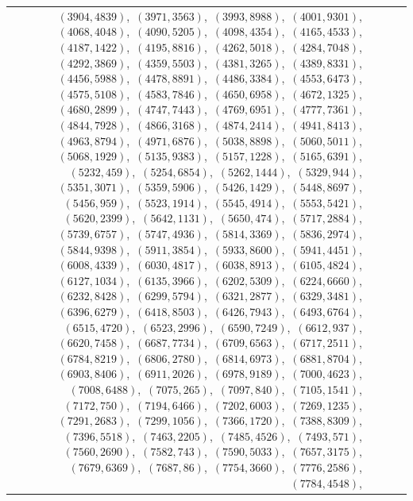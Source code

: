 \documentclass[11pt]{article}
\begin{document}
\begin{longtable}{@{}rrl>{\raggedright\arraybackslash}p{}@{}}
$(3904,4839)$,\allowbreak\ $(3971,3563)$,\allowbreak\ $(3993,8988)$,\allowbreak\ $(4001,9301)$,\allowbreak\ $(4068,4048)$,\allowbreak\ $(4090,5205)$,\allowbreak\ $(4098,4354)$,\allowbreak\ $(4165,4533)$,\allowbreak\ $(4187,1422)$,\allowbreak\ $(4195,8816)$,\allowbreak\ $(4262,5018)$,\allowbreak\ $(4284,7048)$,\allowbreak\ $(4292,3869)$,\allowbreak\ $(4359,5503)$,\allowbreak\ $(4381,3265)$,\allowbreak\ $(4389,8331)$,\allowbreak\ $(4456,5988)$,\allowbreak\ $(4478,8891)$,\allowbreak\ $(4486,3384)$,\allowbreak\ $(4553,6473)$,\allowbreak\ $(4575,5108)$,\allowbreak\ $(4583,7846)$,\allowbreak\ $(4650,6958)$,\allowbreak\ $(4672,1325)$,\allowbreak\ $(4680,2899)$,\allowbreak\ $(4747,7443)$,\allowbreak\ $(4769,6951)$,\allowbreak\ $(4777,7361)$,\allowbreak\ $(4844,7928)$,\allowbreak\ $(4866,3168)$,\allowbreak\ $(4874,2414)$,\allowbreak\ $(4941,8413)$,\allowbreak\ $(4963,8794)$,\allowbreak\ $(4971,6876)$,\allowbreak\ $(5038,8898)$,\allowbreak\ $(5060,5011)$,\allowbreak\ $(5068,1929)$,\allowbreak\ $(5135,9383)$,\allowbreak\ $(5157,1228)$,\allowbreak\ $(5165,6391)$,\allowbreak\ $(5232,459)$,\allowbreak\ $(5254,6854)$,\allowbreak\ $(5262,1444)$,\allowbreak\ $(5329,944)$,\allowbreak\ $(5351,3071)$,\allowbreak\ $(5359,5906)$,\allowbreak\ $(5426,1429)$,\allowbreak\ $(5448,8697)$,\allowbreak\ $(5456,959)$,\allowbreak\ $(5523,1914)$,\allowbreak\ $(5545,4914)$,\allowbreak\ $(5553,5421)$,\allowbreak\ $(5620,2399)$,\allowbreak\ $(5642,1131)$,\allowbreak\ $(5650,474)$,\allowbreak\ $(5717,2884)$,\allowbreak\ $(5739,6757)$,\allowbreak\ $(5747,4936)$,\allowbreak\ $(5814,3369)$,\allowbreak\ $(5836,2974)$,\allowbreak\ $(5844,9398)$,\allowbreak\ $(5911,3854)$,\allowbreak\ $(5933,8600)$,\allowbreak\ $(5941,4451)$,\allowbreak\ $(6008,4339)$,\allowbreak\ $(6030,4817)$,\allowbreak\ $(6038,8913)$,\allowbreak\ $(6105,4824)$,\allowbreak\ $(6127,1034)$,\allowbreak\ $(6135,3966)$,\allowbreak\ $(6202,5309)$,\allowbreak\ $(6224,6660)$,\allowbreak\ $(6232,8428)$,\allowbreak\ $(6299,5794)$,\allowbreak\ $(6321,2877)$,\allowbreak\ $(6329,3481)$,\allowbreak\ $(6396,6279)$,\allowbreak\ $(6418,8503)$,\allowbreak\ $(6426,7943)$,\allowbreak\ $(6493,6764)$,\allowbreak\ $(6515,4720)$,\allowbreak\ $(6523,2996)$,\allowbreak\ $(6590,7249)$,\allowbreak\ $(6612,937)$,\allowbreak\ $(6620,7458)$,\allowbreak\ $(6687,7734)$,\allowbreak\ $(6709,6563)$,\allowbreak\ $(6717,2511)$,\allowbreak\ $(6784,8219)$,\allowbreak\ $(6806,2780)$,\allowbreak\ $(6814,6973)$,\allowbreak\ $(6881,8704)$,\allowbreak\ $(6903,8406)$,\allowbreak\ $(6911,2026)$,\allowbreak\ $(6978,9189)$,\allowbreak\ $(7000,4623)$,\allowbreak\ $(7008,6488)$,\allowbreak\ $(7075,265)$,\allowbreak\ $(7097,840)$,\allowbreak\ $(7105,1541)$,\allowbreak\ $(7172,750)$,\allowbreak\ $(7194,6466)$,\allowbreak\ $(7202,6003)$,\allowbreak\ $(7269,1235)$,\allowbreak\ $(7291,2683)$,\allowbreak\ $(7299,1056)$,\allowbreak\ $(7366,1720)$,\allowbreak\ $(7388,8309)$,\allowbreak\ $(7396,5518)$,\allowbreak\ $(7463,2205)$,\allowbreak\ $(7485,4526)$,\allowbreak\ $(7493,571)$,\allowbreak\ $(7560,2690)$,\allowbreak\ $(7582,743)$,\allowbreak\ $(7590,5033)$,\allowbreak\ $(7657,3175)$,\allowbreak\ $(7679,6369)$,\allowbreak\ $(7687,86)$,\allowbreak\ $(7754,3660)$,\allowbreak\ $(7776,2586)$,\allowbreak\ $(7784,4548)$,\allowbreak\ 
\end{longtable}
\end{document}
